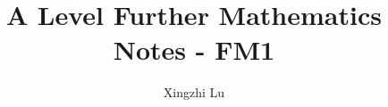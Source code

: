 \documentclass[oneside, fleqn, 11pt]{book}
\title{A Level Further Mathematics Notes - FM1}
\author{Xingzhi Lu}
\date{}
\begin{document}
\maketitle
\everymath{\displaystyle}
\tableofcontents


\end{document}
